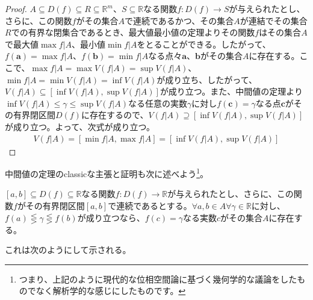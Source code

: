 \documentclass[dvipdfmx]{jsarticle}
\begin{document}
\begin{proof}
$A \subseteq D(f) \subseteq R \subseteq \mathbb{R}^{m}$、$S \subseteq \mathbb{R}$なる関数$f:D(f) \rightarrow S$が与えられたとし、さらに、この関数$f$がその集合$A$で連続であるかつ、その集合$A$が連結でその集合$R$での有界な閉集合であるとき、最大値最小値の定理よりその関数$f$はその集合$A$で最大値$\max{f|A}$、最小値$\min{f|A}$をとることができる。したがって、$f\left( \mathbf{a} \right) = \max{f|A}$、$f\left( \mathbf{b} \right) = \min{f|A}$なる点々$\mathbf{a}$、$\mathbf{b}$がその集合$A$に存在する。ここで、$\max{f|A} = \max{V\left( f|A \right)} = \sup{V\left( f|A \right)}$、$\min{f|A} = \min{V\left( f|A \right)} = \inf{V\left( f|A \right)}$が成り立ち、したがって、$V\left( f|A \right) \subseteq \left[ \inf{V\left( f|A \right)},\sup{V\left( f|A \right)} \right]$が成り立つ。また、中間値の定理より$\inf{V\left( f|A \right)} \leq \gamma \leq \sup{V\left( f|A \right)}$なる任意の実数$\gamma$に対し$f\left( \mathbf{c} \right) = \gamma$なる点$\mathbf{c}$がその有界閉区間$D(f)$に存在するので、$V\left( f|A \right) \supseteq \left[ \inf{V\left( f|A \right)},\sup{V\left( f|A \right)} \right]$が成り立つ。よって、次式が成り立つ。
\begin{align*}
V\left( f|A \right) = \left[ \min{f|A},\max{f|A} \right] = \left[ \inf{V\left( f|A \right)},\sup{V\left( f|A \right)} \right]
\end{align*}
\end{proof}\par
中間値の定理のclassicな主張と証明も次に述べよう\footnote{つまり、上記のように現代的な位相空間論に基づく幾何学的な議論をしたものでなく解析学的な感じにしたものです。}。
\begin{thm}[中間値の定理]\label{4.1.12.9}
$[ a,b] \subseteq D(f) \subseteq \mathbb{R}$なる関数$f:D(f) \rightarrow \mathbb{R}$が与えられたとし、さらに、この関数$f$がその有界閉区間$[ a,b]$で連続であるとする。$\forall a,b \in A\forall\gamma \in \mathbb{R}$に対し、$f(a) \lesseqgtr \gamma \lesseqgtr f(b)$が成り立つなら、$f(c) = \gamma$なる実数$c$がその集合$A$に存在する。
\end{thm}\par
これは次のようにして示される。
\end{document}
